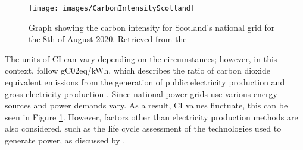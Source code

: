 \documentclass{l4proj}
\begin{document}
\begin{figure}[h]
    \centering
    \texttt{[image: images/CarbonIntensityScotland]}
    ~
    \caption{Graph showing the carbon intensity for Scotland's national grid for the 8th of August 2020. Retrieved from the \cite{carbon_intensity_api}}
    \label{fig:carbonIntensityScotland}
\end{figure}

The units of CI can vary depending on the circumstances; however, in this context, follow gC02eq/kWh, which describes the ratio of carbon dioxide equivalent emissions from the generation of public electricity production and gross electricity production \citep{EEA_CO2_emission_intensity}.
Since national power grids use various energy sources and power demands vary.
As a result, CI values fluctuate, this can be seen in Figure \ref{fig:carbonIntensityScotland}.
However, factors other than electricity production methods are also considered, such as the life cycle assessment of the technologies used to generate power, as discussed by \cite{PEHNT200655}.

%
%
\end{document}
